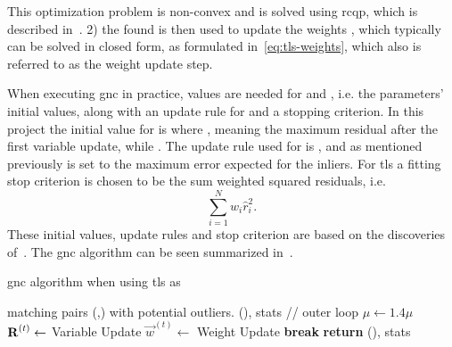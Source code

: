 This optimization problem is non-convex and is solved using \gls{rcqp}, which is described in~. 2) the found \tf[T]{}{} is then used to update the weights , which typically can be solved in closed form, as formulated in~\eqref{eq:tls-weights}, which also is referred to as the weight update step. \medskip

When executing \gls{gnc} in practice, values are needed for  and , i.e. the parameters' initial values, along with an update rule for \mvar{\mu} and a stopping criterion. 
In this project the initial value for \mvar{\mu} is  where , meaning the maximum residual after the first variable update, while . The update rule used for \mvar{\mu} is \mvar{\mu\leftarrow 1.4\mu}, and as mentioned previously  is set to the maximum error expected for the inliers. For \gls{tls} a fitting stop criterion is chosen to be the sum weighted squared residuals, i.e.
\begin{equation}
	\sum^N_{i=1}w_i\hat{r}_i^2.
\end{equation}
These initial values, update rules and stop criterion are based on the discoveries of~\cite{graduated-non-convexity-for-robust-spatial-perception:-from-non-minimal-solvers-to-global-outlier-rejection}. The \gls{gnc} algorithm can be seen summarized in~.

\begin{algorithm}
	\algrenewcommand{}
	\algrenewcommand{}
	\caption{\gls{gnc} algorithm when using \gls{tls} as \mvar{\rho(\cdot)}}
	\label{alg:gnc}
	\begin{algorithmic}[1]
		\Require matching pairs (,) with potential outliers.
		\Ensure (), stats
		\State {}
		 // outer loop
			\State $\mu\gets 1.4\mu$
			\State $\bm{\mathrm{R}}^{(t)} \gets $ Variable Update
			\State $\vec{w}^{(t)} \gets $ Weight Update
				\State \textbf{break}
			\EndIf
		\EndWhile
		\State \textbf{return} (), stats
	\end{algorithmic}
\end{algorithm}

